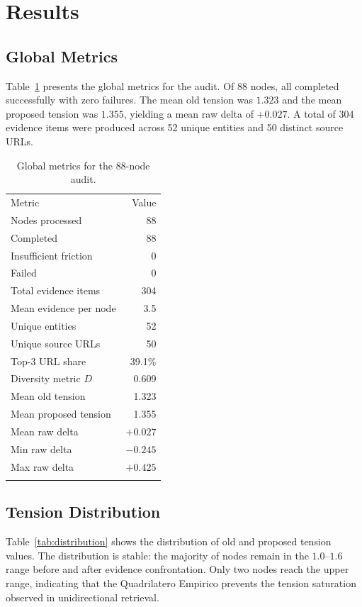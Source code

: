 \documentclass[10pt,twocolumn]{article}
\let\oldtoprule\toprule
\let\oldmidrule\midrule
\let\oldbottomrule\bottomrule
\renewcommand{\toprule}{\arrayrulecolor{deepblue}\oldtoprule}
\renewcommand{\midrule}{\arrayrulecolor{deepblue}\oldmidrule}
\renewcommand{\bottomrule}{\arrayrulecolor{deepblue}\oldbottomrule}
\begin{document}
\section{Results}
\label{sec:results}

\subsection{Global Metrics}

Table~\ref{tab:global} presents the global metrics for the audit. Of 88 nodes, all completed successfully with zero failures. The mean old tension was $1.323$ and the mean proposed tension was $1.355$, yielding a mean raw delta of $+0.027$. A total of 304 evidence items were produced across 52 unique entities and 50 distinct source URLs.

\begin{table}[htbp]
\centering
\caption{Global metrics for the 88-node audit.}
\label{tab:global}
\begin{tabular}{@{}lr@{}}
\toprule
Metric & Value \\
\midrule
Nodes processed & 88 \\
Completed & 88 \\
Insufficient friction & 0 \\
Failed & 0 \\
Total evidence items & 304 \\
Mean evidence per node & 3.5 \\
Unique entities & 52 \\
Unique source URLs & 50 \\
Top-3 URL share & 39.1\% \\
Diversity metric $D$ & 0.609 \\
Mean old tension & 1.323 \\
Mean proposed tension & 1.355 \\
Mean raw delta & $+0.027$ \\
Min raw delta & $-0.245$ \\
Max raw delta & $+0.425$ \\
\bottomrule
\end{tabular}
\end{table}

\subsection{Tension Distribution}

Table~\ref{tab:distribution} shows the distribution of old and proposed tension values. The distribution is stable: the majority of nodes remain in the $1.0$--$1.6$ range before and after evidence confrontation. Only two nodes reach the upper range, indicating that the Quadrilatero Empirico prevents the tension saturation observed in unidirectional retrieval.
\end{document}
